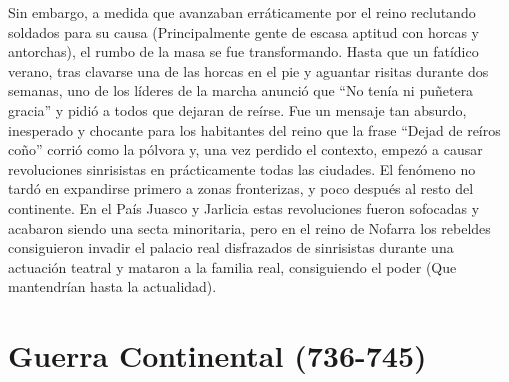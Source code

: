 Sin embargo, a medida que avanzaban erráticamente por el reino reclutando soldados para su causa (Principalmente gente de escasa aptitud con horcas y antorchas), el rumbo de la masa se fue transformando. Hasta que un fatídico verano, tras clavarse una de las horcas en el pie y aguantar risitas durante dos semanas, uno de los líderes de la marcha anunció que ``No tenía ni puñetera gracia'' y pidió a todos que dejaran de reírse. Fue un mensaje tan absurdo, inesperado y chocante para los habitantes del reino que la frase ``Dejad de reíros coño'' corrió como la pólvora y, una vez perdido el contexto, empezó a causar revoluciones sinrisistas en prácticamente todas las ciudades. El fenómeno no tardó en expandirse primero a zonas fronterizas, y poco después al resto del continente. En el País Juasco y Jarlicia estas revoluciones fueron sofocadas y acabaron siendo una secta minoritaria, pero en el reino de Nofarra los rebeldes consiguieron invadir el palacio real disfrazados de sinrisistas durante una actuación teatral y mataron a la familia real, consiguiendo el poder (Que mantendrían hasta la actualidad). 

\section*{Guerra Continental (736-745)}
 
